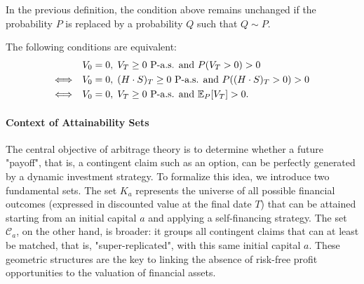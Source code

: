 \begin{remarks}
\item[(a)] In the previous definition, the condition above remains unchanged if the probability $P$ is replaced by a probability $Q$ such that $Q \sim P$.
\item[(b)] The following conditions are equivalent:
\begin{align}
& V_0 = 0, \; V_T \ge 0 \text{ P-a.s. and } P(V_T > 0) > 0 \\
\Longleftrightarrow \quad & V_0 = 0, \; (H \cdot S)_T \ge 0 \text{ P-a.s. and } P((H \cdot S)_T > 0) > 0 \\
\Longleftrightarrow \quad & V_0 = 0, \; V_T \ge 0 \text{ P-a.s. and } \mathbb{E}_P[V_T] > 0.
\end{align}
\end{remarks}

\paragraph*{Context of Attainability Sets}
The central objective of arbitrage theory is to determine whether a future "payoff", that is, a contingent claim such as an option, can be perfectly generated by a dynamic investment strategy. To formalize this idea, we introduce two fundamental sets. The set $K_a$ represents the universe of all possible financial outcomes (expressed in discounted value at the final date $T$) that can be attained starting from an initial capital $a$ and applying a self-financing strategy. The set $\mathcal{C}_a$, on the other hand, is broader: it groups all contingent claims that can at least be matched, that is, "super-replicated", with this same initial capital $a$. These geometric structures are the key to linking the absence of risk-free profit opportunities to the valuation of financial assets.


